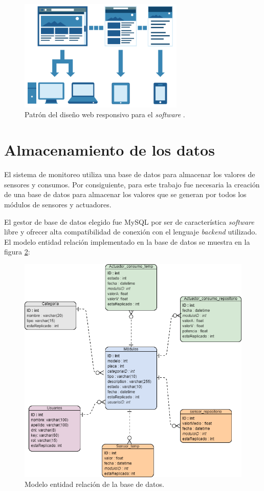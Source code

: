 \begin{figure}[htpb]
\centering 
\includegraphics[width=0.7\textwidth]{./Figures/responsive3.png}
\caption{Patrón del diseño web responsivo para el \emph{software} \protect\footnotemark.}
\label{fig:patrondiseniosoftware}
\end{figure}



\section{Almacenamiento de los datos}

El sistema de monitoreo utiliza una base de datos para almacenar los valores de sensores y consumos. Por consiguiente, para este trabajo fue necesaria la creación de una base de datos para almacenar los valores que se generan por todos los módulos de sensores y actuadores. 

El gestor de base de datos elegido fue MySQL por ser de característica \emph{software} libre y ofrecer alta compatibilidad de conexión con el lenguaje \emph{backend} utilizado. El modelo entidad relación implementado en la base de datos se muestra en la figura \ref{fig:entidadrelacion}:

\begin{figure}[htpb]
\centering 
\includegraphics[width=1.0\textwidth]{./Figures/entidad-relacion.png}
\caption{Modelo entidad relación de la base de datos.}
\label{fig:entidadrelacion}
\end{figure}